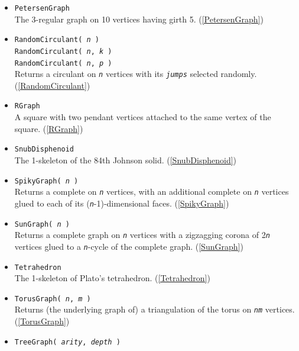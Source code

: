 \documentclass[a4paper,11pt]{report}
\begin{document}
{{\begin{itemize}
 A triangle with a pendant vertex. (\ref{PawGraph}) 
\item \texttt{PetersenGraph}\\
 The 3-regular graph on 10 vertices having girth 5. (\ref{PetersenGraph}) 
\item \texttt{RandomCirculant( \mbox{\texttt{\mdseries\slshape n}} )}\\
 \texttt{RandomCirculant( \mbox{\texttt{\mdseries\slshape n}}, \mbox{\texttt{\mdseries\slshape k}} )}\\
 \texttt{RandomCirculant( \mbox{\texttt{\mdseries\slshape n}}, \mbox{\texttt{\mdseries\slshape p}} )}\\
 Returns a circulant on \mbox{\texttt{\mdseries\slshape n}} vertices with its \mbox{\texttt{\mdseries\slshape jumps}} selected randomly. (\ref{RandomCirculant}) 
\item \texttt{RGraph}\\
 A square with two pendant vertices attached to the same vertex of the square.
(\ref{RGraph}) 
\item \texttt{SnubDisphenoid}\\
 The 1-skeleton of the 84th Johnson solid. (\ref{SnubDisphenoid}) 
\item \texttt{SpikyGraph( \mbox{\texttt{\mdseries\slshape n}} )}\\
 Returns a complete on \mbox{\texttt{\mdseries\slshape n}} vertices, with an additional complete on \mbox{\texttt{\mdseries\slshape n}} vertices glued to each of its (\mbox{\texttt{\mdseries\slshape n}}-1)-dimensional faces. (\ref{SpikyGraph}) 
\item \texttt{SunGraph( \mbox{\texttt{\mdseries\slshape n}} )}\\
 Returns a complete graph on \mbox{\texttt{\mdseries\slshape n}} vertices with a zigzagging corona of 2\mbox{\texttt{\mdseries\slshape n}} vertices glued to a \mbox{\texttt{\mdseries\slshape n}}-cycle of the complete graph. (\ref{SunGraph}) 
\item \texttt{Tetrahedron}\\
 The 1-skeleton of Plato's tetrahedron. (\ref{Tetrahedron}) 
\item \texttt{TorusGraph( \mbox{\texttt{\mdseries\slshape n}}, \mbox{\texttt{\mdseries\slshape m}} )}\\
 Returns (the underlying graph of) a triangulation of the torus on \mbox{\texttt{\mdseries\slshape nm}} vertices. (\ref{TorusGraph}) 
\item \texttt{TreeGraph( \mbox{\texttt{\mdseries\slshape arity}}, \mbox{\texttt{\mdseries\slshape depth}} )}\\

\end{itemize}}}
\end{document}
